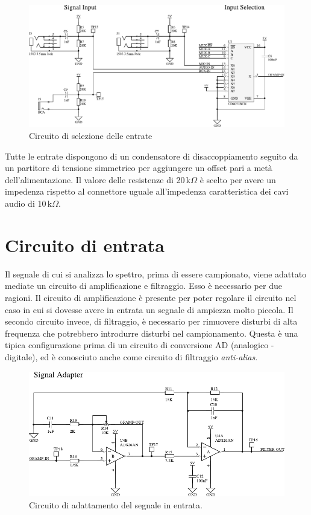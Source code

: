 \begin{figure}[H] \centering
    \includegraphics[width=.8\linewidth]{figures/circuits/input-selection.pdf}
    \caption{Circuito di selezione delle entrate \label{fig:input-selection}}
\end{figure}

Tutte le entrate dispongono di un condensatore di disaccoppiamento seguito da
un partitore di tensione simmetrico per aggiungere un offset pari a met\`a
dell'alimentazione. Il valore delle resistenze di 20\,k\(\Omega\) \`e scelto
per avere un impedenza rispetto al connettore uguale all'impedenza
caratteristica dei cavi audio di 10\,k\(\Omega\).

\section{Circuito di entrata}
Il segnale di cui si analizza lo spettro, prima di essere campionato, viene
adattato mediate un circuito di amplificazione e filtraggio. Esso \`e
necessario per due ragioni. Il circuito di amplificazione \`e presente per
poter regolare il circuito nel caso in cui si dovesse avere in entrata un
segnale di ampiezza molto piccola. Il secondo circuito invece, di filtraggio,
\`e necessario per rimuovere disturbi di alta frequenza che potrebbero
introdurre disturbi nel campionamento. Questa \`e una tipica configurazione
prima di un circuito di conversione AD (analogico - digitale), ed \`e
conosciuto anche come circuito di filtraggio \emph{anti-alias}.

\begin{figure}[H] \centering
    \includegraphics[width=.8\linewidth]{figures/circuits/filter-ampl.pdf}
    \caption[Circuito di adattamento del segnale]{
        Circuito di adattamento del segnale in entrata.
        \label{fig:filter-ampl}
    }
\end{figure}

